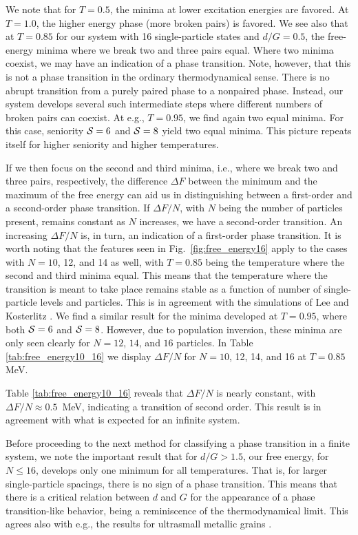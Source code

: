 \documentclass[rmp,aps,floatfix]{revtex4}
\begin{document}
We note that for $T=0.5$, the minima at lower excitation
energies are favored. 
At $T=1.0$, the higher energy
phase (more broken pairs) is favored.
We see also that at $T=0.85$ for our system with 
16 single-particle states and $d/G=0.5$,
the free-energy minima where we break two and three pairs 
equal. 
Where two minima coexist, we may have an
indication  of a phase transition. Note, however, that this is not a 
phase transition in the ordinary thermodynamical sense.
There is no abrupt transition from a purely paired phase to a 
nonpaired phase.  
Instead, our system develops several such intermediate steps
where different numbers of broken pairs can coexist. 
At e.g., $T=0.95$, we find again two equal minima. For this case,
seniority ${\cal S}=6$ and ${\cal S}=8$ yield two equal minima.
This picture repeats itself for higher seniority and higher temperatures.

If we then focus on the second and third minima, i.e., where we break
two and three pairs, respectively, the difference $\Delta F$ between the 
minimum and the maximum of the free energy can aid us in distinguishing
between a first-order and a second-order phase transition. If $\Delta F/N$,
with $N$ being the number of particles present, remains constant as $N$
increases, we have a second-order transition. An increasing $\Delta F/N$
is, in turn, an indication of a first-order phase transition. 
It is worth noting that the features
seen in Fig.~\ref{fig:free_energy16} apply to the cases with $N=10$, 12, 
and 14 as well, with $T=0.85$ being the temperature where the second and
third minima equal. This means that the temperature where the transition
is meant to take place remains stable as a function of number of single-particle
levels and particles. This is in agreement with the simulations of 
Lee and Kosterlitz \cite{lk90,lk91}. We find a similar result for the minima
developed at $T=0.95$, where both ${\cal S}=6$ and ${\cal S}=8$.
However, due to population inversion, these minima are only seen clearly
for $N=12$, $14$, and $16$ particles.
In Table \ref{tab:free_energy10_16} we display $\Delta F/N$ for 
$N=10$, 12, 14, and 16 at $T=0.85$ MeV. 

Table \ref{tab:free_energy10_16} reveals that $\Delta F/N$ is nearly
constant, with  $\Delta F/N\approx 0.5$~MeV, indicating a 
transition of second order. This result is in 
agreement with what is expected for an infinite system. 

Before proceeding to the next method for classifying a phase transition
in a finite system, we note the important result that for $d/G > 1.5$, 
our free energy, for $N\le 16$, develops
only one minimum for all temperatures. That is, for larger single-particle
spacings, there is no sign of a phase transition. This means that there
is a critical relation between $d$ and $G$ for the appearance of a phase 
transition-like behavior, being a  reminiscence of the thermodynamical limit.
This agrees also with e.g., the results for ultrasmall metallic grains
\cite{delft2000}. 
\end{document}
